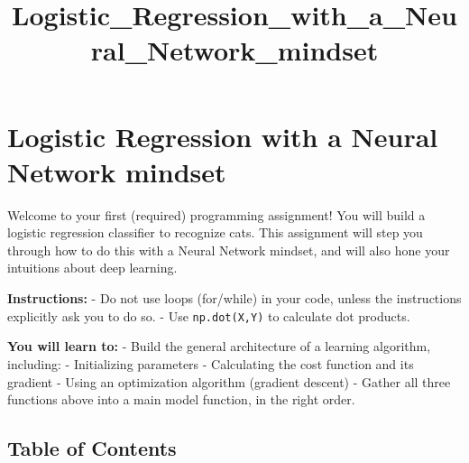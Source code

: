 \documentclass[11pt]{article}
\title{Logistic\_Regression\_with\_a\_Neural\_Network\_mindset}
\begin{document}
    
    \maketitle
    
    

    
    \hypertarget{logistic-regression-with-a-neural-network-mindset}{%
\section{Logistic Regression with a Neural Network
mindset}\label{logistic-regression-with-a-neural-network-mindset}}

Welcome to your first (required) programming assignment! You will build
a logistic regression classifier to recognize cats. This assignment will
step you through how to do this with a Neural Network mindset, and will
also hone your intuitions about deep learning.

\textbf{Instructions:} - Do not use loops (for/while) in your code,
unless the instructions explicitly ask you to do so. - Use
\texttt{np.dot(X,Y)} to calculate dot products.

\textbf{You will learn to:} - Build the general architecture of a
learning algorithm, including: - Initializing parameters - Calculating
the cost function and its gradient - Using an optimization algorithm
(gradient descent) - Gather all three functions above into a main model
function, in the right order.

    \hypertarget{table-of-contents}{%
\subsection{Table of Contents}\label{table-of-contents}}
\end{document}
